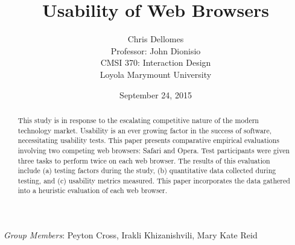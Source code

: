 \documentclass{article}
\begin{document}
\title{Usability of Web Browsers}
\author{Chris Dellomes\\
Professor: John Dionisio\\
CMSI 370: Interaction Design\\
	Loyola Marymount University}

\date{September 24, 2015}

\maketitle

\begin{center}
\begin{abstract}
\noindent This study is in response to the escalating competitive nature of the modern technology market. Usability is an ever growing factor in the success of software, necessitating usability tests. This paper presents comparative empirical evaluations involving two competing web browsers: Safari and Opera. Test participants were given three tasks to perform twice on each web browser. The results of this evaluation include (a) testing factors during the study, (b) quantitative data collected during testing, and (c) usability metrics measured. This paper incorporates the data gathered into a heuristic evaluation of each web browser.
\end{abstract}


\bigskip

\textit{Group Members}: Peyton Cross, Irakli Khizanishvili, Mary Kate Reid
\end{center}

\thispagestyle{empty}

\clearpage

\setcounter{page}{1}
\end{document}
